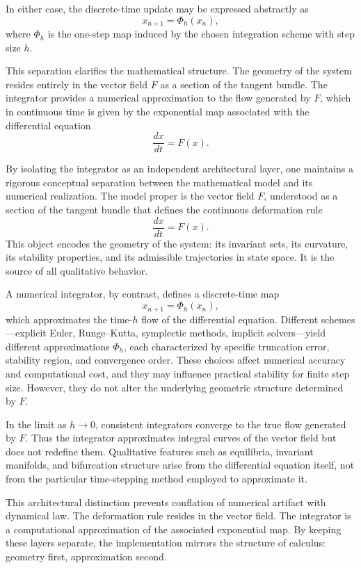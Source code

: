 \documentclass[12pt]{book}
\begin{document}
In either case, the discrete-time update may be expressed abstractly as
\[
x_{n+1} = \Phi_h(x_n),
\]
where $\Phi_h$ is the one-step map induced by the chosen integration
scheme with step size $h$.

This separation clarifies the mathematical structure. The geometry of
the system resides entirely in the vector field $F$ as a section of
the tangent bundle. The integrator provides a numerical approximation
to the flow generated by $F$, which in continuous time is given by the
exponential map associated with the differential equation
\[
\frac{dx}{dt} = F(x).
\]

By isolating the integrator as an independent architectural layer, one
maintains a rigorous conceptual separation between the mathematical
model and its numerical realization. The model proper is the vector
field $F$, understood as a section of the tangent bundle that defines
the continuous deformation rule
\[
\frac{dx}{dt} = F(x).
\]
This object encodes the geometry of the system: its invariant sets,
its curvature, its stability properties, and its admissible
trajectories in state space. It is the source of all qualitative
behavior.

A numerical integrator, by contrast, defines a discrete-time map
\[
x_{n+1} = \Phi_h(x_n),
\]
which approximates the time-$h$ flow of the differential equation.
Different schemes---explicit Euler, Runge--Kutta, symplectic
methods, implicit solvers---yield different approximations
$\Phi_h$, each characterized by specific truncation error, stability
region, and convergence order. These choices affect numerical
accuracy and computational cost, and they may influence practical
stability for finite step size. However, they do not alter the
underlying geometric structure determined by $F$.

In the limit as $h \to 0$, consistent integrators converge to the
true flow generated by $F$. Thus the integrator approximates integral
curves of the vector field but does not redefine them. Qualitative
features such as equilibria, invariant manifolds, and bifurcation
structure arise from the differential equation itself, not from the
particular time-stepping method employed to approximate it.

This architectural distinction prevents conflation of numerical
artifact with dynamical law. The deformation rule resides in the
vector field. The integrator is a computational approximation of the
associated exponential map. By keeping these layers separate, the
implementation mirrors the structure of calculus: geometry first,
approximation second.
\end{document}
